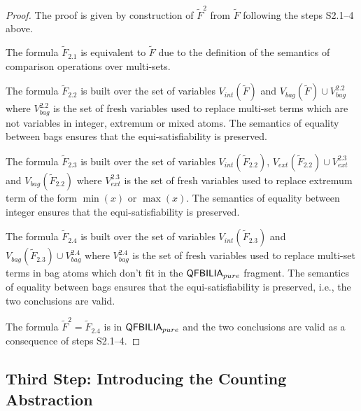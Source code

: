 \begin{proof}
The proof is given by construction of $\tilde{F}^2$ from $\tilde{F}$ following the steps S2.1--4 above.

The formula $\tilde{F}_{2.1}$ is equivalent to $\tilde{F}$ due to the definition of the semantics of comparison operations over multi-sets.

The formula $\tilde{F}_{2.2}$ is built over the set of variables
$V_{int}(\tilde{F})$ and $V_{bag}(\tilde{F})\cup V^{2.2}_{bag}$
where $V^{2.2}_{bag}$ is the set of fresh variables used to replace multi-set terms which are not variables in integer, extremum or mixed atoms. The semantics of equality between bags ensures that the equi-satisfiability is preserved.

The formula $\tilde{F}_{2.3}$ is built over the set of variables
$V_{int}(\tilde{F}_{2.2})$, $V_{ext}(\tilde{F}_{2.2})\cup V^{2.3}_{ext}$ and $V_{bag}(\tilde{F}_{2.2})$
where $V^{2.3}_{ext}$ is the set of fresh variables used to replace extremum term of the form $\min(x)$ or $\max(x)$. The semantics of equality between integer ensures that the equi-satisfiability is preserved.

The formula $\tilde{F}_{2.4}$ is built over the set of variables
$V_{int}(\tilde{F}_{2.3})$ and $V_{bag}(\tilde{F}_{2.3})\cup V^{2.4}_{bag}$
where $V^{2.4}_{bag}$ is the set of fresh variables used to replace multi-set terms in bag atoms which don't fit in the $\textsf{QFBILIA}_{pure}$ fragment. The semantics of equality between bags ensures that the equi-satisfiability is preserved, i.e., the two conclusions are valid.

The formula $\tilde{F}^2 = \tilde{F}_{2.4}$ is in $\textsf{QFBILIA}_{pure}$ and the two conclusions are valid as a consequence of steps S2.1--4.

\end{proof}



\subsection{Third Step: Introducing the Counting Abstraction}

